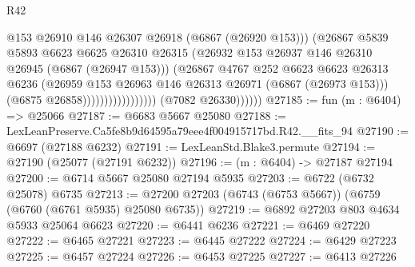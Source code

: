 \begin{lexlean}{R42}
\begin{coremodule}
{                                            @153
                                            @26910
                                            @146
                                            @26307
                                            @26918
                                            (@6867 (@26920 @153)))
                                          (@26867
                                            @5839
                                            @5893
                                            @6623
                                            @6625
                                            @26310
                                            @26315
                                            (@26932
                                              @153
                                              @26937
                                              @146
                                              @26310
                                              @26945
                                              (@6867 (@26947 @153)))
                                            (@26867
                                              @4767
                                              @252
                                              @6623
                                              @6623
                                              @26313
                                              @6236
                                              (@26959
                                                @153
                                                @26963
                                                @146
                                                @26313
                                                @26971
                                                (@6867 (@26973 @153)))
                                              (@6875 @26858)))))))))))))))))
              (@7082 @26330))))))
@27185 := fun (m : @6404) => @25066
@27187 := @6683 @5667 @25080
@27188 := LexLeanPreserve.Ca5fe8b9d64595a79eee4f004915717bd.R42.__fits_94
@27190 := @6697 (@27188 @6232)
@27191 := LexLeanStd.Blake3.permute
@27194 := @27190 (@25077 (@27191 @6232))
@27196 := (m : @6404) -> @27187 @27194
@27200 := @6714 @5667 @25080 @27194 @5935
@27203 := @6722 (@6732 @25078) @6735
@27213 := @27200 @27203 (@6743 (@6753 @5667)) (@6759 (@6760 (@6761 @5935) @25080 @6735))
@27219 := @6892 @27203 @803 @4634 @5933 @25064 @6623
@27220 := @6441 @6236
@27221 := @6469 @27220
@27222 := @6465 @27221
@27223 := @6445 @27222
@27224 := @6429 @27223
@27225 := @6457 @27224
@27226 := @6453 @27225
@27227 := @6413 @27226
}
\end{coremodule}
\end{lexlean}
